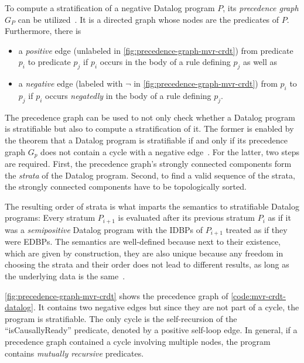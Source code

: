 To compute a stratification of a negative Datalog program \(P\),
its \emph{precedence graph} \(G_P\) can be utilized~\cite{green2013datalog}.
It is a directed graph whose nodes are the predicates of \(P\).
Furthermore, there is

\begin{itemize}
	\item a \emph{positive} edge
	      (unlabeled in \ref{fig:precedence-graph-mvr-crdt})
	      from predicate \(p_i\) to predicate \(p_j\)
	      if \(p_i\) occurs in the body of a rule defining \(p_j\) as well as
	\item a \emph{negative} edge
	      (labeled with \(\lnot\) in \ref{fig:precedence-graph-mvr-crdt})
	      from \(p_i\) to \(p_j\)
	      if \(p_i\) occurs \emph{negatedly} in the body of a rule defining \(p_j\).
\end{itemize}

The precedence graph can be used to not only check whether a Datalog
program is stratifiable but also to compute a stratification of it.
The former is enabled by the theorem that a Datalog program is stratifiable
if and only if its precedence graph \(G_p\) does not contain a cycle
with a negative edge~\cite{green2013datalog}.
For the latter, two steps are required.
First, the precedence graph's strongly connected components form the
\emph{strata} of the Datalog program.
Second, to find a valid sequence of the strata,
the strongly connected components have to be topologically sorted.

The resulting order of strata is what imparts the semantics to stratifiable
Datalog programs:
Every stratum \(P_{i+1}\) is evaluated after its previous stratum \(P_{i}\)
as if it was a \emph{semipositive} Datalog program with the \acp{IDBP}
of \(P_{i+1}\) treated as if they were \acp{EDBP}.
The semantics are well-defined because next to their existence,
which are given by construction, they are also unique because any freedom
in choosing the strata and their order does not lead to different results,
as long as the underlying data is the same~\cite{apt1988towards}.

\ref{fig:precedence-graph-mvr-crdt} shows the precedence graph
of \ref{code:mvr-crdt-datalog}.
It contains two negative edges but since they are not part of a cycle,
the program is stratifiable.
The only cycle is the self-recursion of the ``isCausallyReady'' predicate,
denoted by a positive self-loop edge.
In general, if a precedence graph contained a cycle involving multiple nodes,
the program contains \emph{mutually recursive} predicates.


